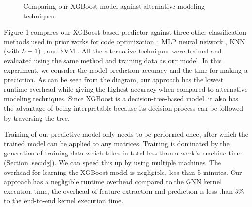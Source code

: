 \begin{figure}[t!]
\centering
{}%
%
\centering
\vspace{-4mm}
\caption{Comparing our XGBoost model against alternative modeling techniques.}
\label{fig:alternatemodel}
\vspace{-5mm}
\end{figure}

 Figure \ref{fig:alternatemodel} compares our XGBoost-based predictor against three other
classification methods used in prior works for code optimization~\cite{wang2018machine}:  MLP neural network \cite{gardner1998artificial},
KNN (with $k=1$) \cite{zhang2007ml}, and SVM \cite{noble2006support}. All the alternative techniques were trained and evaluated using the
same method and training data as our model. In this experiment, we consider the model prediction accuracy and the time for making a
prediction. As can be seen from the diagram, our approach has the lowest runtime overhead while giving the highest accuracy when compared
to alternative modeling techniques. Since XGBoost is a decision-tree-based model, it also has the advantage of being interpretable because
its decision process can be followed by traversing the tree.


 Training of our predictive model only needs to be performed once, after which the trained model can be applied to any matrices. Training is dominated by the generation of training data which takes in total less than a week’s machine time (Section \ref{sec:dg}). We can speed this up by using multiple machines. The overhead for learning the XGBoost model is negligible, less than 5 minutes.
 Our approach has a negligible runtime overhead compared to the GNN kernel execution time, the overhead of feature extraction and prediction is less than 3\% to the end-to-end kernel execution time.

